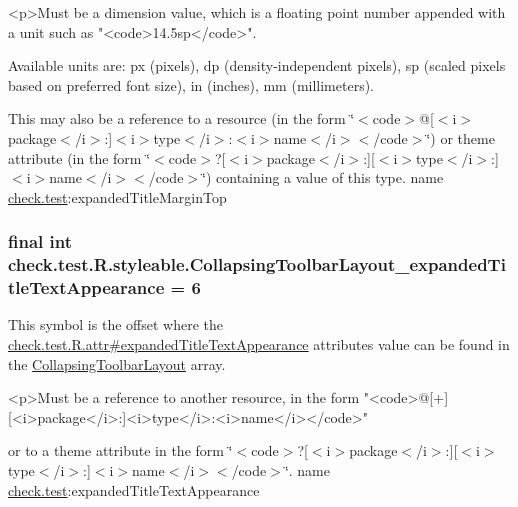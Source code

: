 \begin{DoxyVerb}      <p>Must be a dimension value, which is a floating point number appended with a unit such as "<code>14.5sp</code>".
\end{DoxyVerb}
 Available units are\+: px (pixels), dp (density-\/independent pixels), sp (scaled pixels based on preferred font size), in (inches), mm (millimeters). 

This may also be a reference to a resource (in the form \char`\"{}$<$code$>$@\mbox{[}$<$i$>$package$<$/i$>$\+:\mbox{]}$<$i$>$type$<$/i$>$\+:$<$i$>$name$<$/i$>$$<$/code$>$\char`\"{}) or theme attribute (in the form \char`\"{}$<$code$>$?\mbox{[}$<$i$>$package$<$/i$>$\+:\mbox{]}\mbox{[}$<$i$>$type$<$/i$>$\+:\mbox{]}$<$i$>$name$<$/i$>$$<$/code$>$\char`\"{}) containing a value of this type.  name \hyperlink{namespacecheck_1_1test}{check.\+test}\+:expanded\+Title\+Margin\+Top \hypertarget{classcheck_1_1test_1_1_r_1_1styleable_a01bf5ec327b8ed9194b323abcf3f914c}{}
\subsubsection[{Collapsing\+Toolbar\+Layout\+\_\+expanded\+Title\+Text\+Appearance}]{\setlength{\rightskip}{0pt plus 5cm}final int check.\+test.\+R.\+styleable.\+Collapsing\+Toolbar\+Layout\+\_\+expanded\+Title\+Text\+Appearance = 6\hspace{0.3cm}{\ttfamily [static]}}\label{classcheck_1_1test_1_1_r_1_1styleable_a01bf5ec327b8ed9194b323abcf3f914c}
This symbol is the offset where the \hyperlink{classcheck_1_1test_1_1_r_1_1attr_ae18599f9e5ed90eeaacf5b1b78f48d22}{check.\+test.\+R.\+attr\#expanded\+Title\+Text\+Appearance} attribute\textquotesingle{}s value can be found in the \hyperlink{classcheck_1_1test_1_1_r_1_1styleable_a0c512120c75d0ddac20063034a72db17}{Collapsing\+Toolbar\+Layout} array.

\begin{DoxyVerb}      <p>Must be a reference to another resource, in the form "<code>@[+][<i>package</i>:]<i>type</i>:<i>name</i></code>"
\end{DoxyVerb}
 or to a theme attribute in the form \char`\"{}$<$code$>$?\mbox{[}$<$i$>$package$<$/i$>$\+:\mbox{]}\mbox{[}$<$i$>$type$<$/i$>$\+:\mbox{]}$<$i$>$name$<$/i$>$$<$/code$>$\char`\"{}.  name \hyperlink{namespacecheck_1_1test}{check.\+test}\+:expanded\+Title\+Text\+Appearance \hypertarget{classcheck_1_1test_1_1_r_1_1styleable_a2475ffb2f49d975dd9c976b973c3385f}{}
